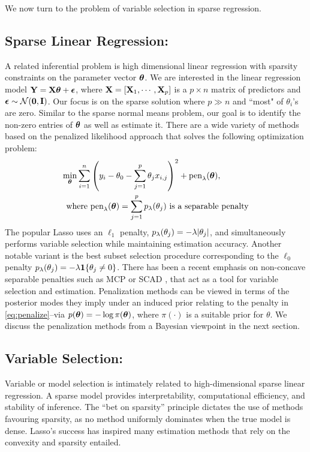 \documentclass[11pt]{article}
\begin{document}
We now turn to the problem of variable selection in sparse regression. 

\subsection{Sparse Linear Regression:} A related inferential problem is high dimensional linear regression with sparsity constraints on the parameter vector
$\boldsymbol{\theta}$. We are interested in the linear regression model ${\bf Y} = {\bf X} \boldsymbol{\theta} + \boldsymbol{\epsilon}$, where ${\bf X} = [{\bf X}_1, \cdots, {\bf X}_p]$ is a $p \times n$ matrix of
predictors and $\boldsymbol{\epsilon} \sim {\cal N}({\bf 0}, {\bf I})$. Our focus is on the sparse solution where $p \gg n$ and ``most" of $\theta_i$'s are zero.  Similar to the
sparse normal means problem, our goal is to identify the non-zero entries of $\boldsymbol{\theta}$ as well as estimate it. There are a wide variety of methods based on
the penalized likelihood approach that solves the following optimization problem:
\begin{align}
  \min_{\boldsymbol{\theta}} \sum_{i=1}^{n} &  \left( y_i - \theta_0 - \sum_{j=1}^{p} \theta_j x_{i,j} \right)^2 + \text{pen}_{\lambda}(\boldsymbol{\theta}), \label{eq:penalize} \\
  \text{where } & \text{pen}_{\lambda}(\boldsymbol{\theta}) = \sum_{j=1}^{p} p_{\lambda}(\theta_j) \text{ is a separable penalty} \nonumber
\end{align}
The popular Lasso uses an $\ell_1$ penalty, $p_{\lambda}(\theta_j) = -\lambda \lvert\theta_j\rvert$, and simultaneously performs variable selection while maintaining estimation accuracy.  Another notable variant is the best subset selection procedure corresponding to the $\ell_0$ penalty $p_{\lambda}(\theta_j) = -\lambda {\bf 1}\{\theta_j \ne 0\}$.
There has been a recent emphasis on non-concave separable penalties such as MCP \citep{zhang2010nearly} or SCAD \citep{fan2001variable}, that act as
a tool for variable selection and estimation. Penalization methods can be viewed in terms of the posterior modes they imply under an induced prior relating to the penalty in \eqref{eq:penalize}--via $p(\boldsymbol{\theta}) = -\log \pi(\boldsymbol{\theta})$, where $\pi(\cdot)$ is a suitable prior for $\theta$. We discuss the penalization methods from a Bayesian viewpoint in
the next section. 

\subsection{Variable Selection:} Variable or model selection is intimately related to high-dimensional sparse linear regression.  A sparse model provides
interpretability, computational efficiency, and stability of inference.  The ``bet on sparsity'' principle \citep{hastie_elements_2009} dictates the use of methods
favouring sparsity, as no method uniformly dominates when the true model is dense.  Lasso's success has inspired many estimation methods that rely on
the convexity and sparsity entailed. 
\end{document}

